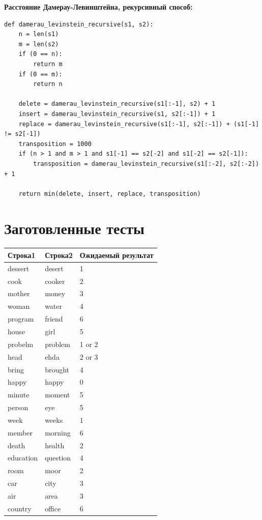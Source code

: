 \documentclass[a4paper,14pt]{report} %
\begin{document}
\textbf{Расстояние Дамерау-Левинштейна, рекурсивный способ: }
\begin{lstlisting}
def damerau_levinstein_recursive(s1, s2):
    n = len(s1)
    m = len(s2)
    if (0 == n):
        return m
    if (0 == m):
        return n

    delete = damerau_levinstein_recursive(s1[:-1], s2) + 1
    insert = damerau_levinstein_recursive(s1, s2[:-1]) + 1
    replace = damerau_levinstein_recursive(s1[:-1], s2[:-1]) + (s1[-1] != s2[-1])
    transposition = 1000
    if (n > 1 and m > 1 and s1[-1] == s2[-2] and s1[-2] == s2[-1]):
        transposition = damerau_levinstein_recursive(s1[:-2], s2[:-2]) + 1

    return min(delete, insert, replace, transposition)
\end{lstlisting}

\section{Заготовленные тесты}

\begin{tabular}{ | l | l | l |}
\hline
\textbf{Строка1} & \textbf{Строка2} & \textbf{Ожидаемый результат} \\ \hline
dessert & desert & 1 \\ \hline
cook & cooker & 2 \\ \hline
mother & money & 3 \\ \hline
woman & water & 4 \\ \hline
program & friend & 6 \\ \hline
house & girl & 5 \\ \hline
probelm & problem & 1 or 2 \\ \hline
head & ehda & 2 or 3 \\ \hline
bring & brought & 4 \\ \hline
happy & happy & 0\\  \hline
minute & moment & 5 \\ \hline
person & eye & 5 \\ \hline
week & weeks & 1 \\ \hline
member & morning & 6 \\ \hline
death & health & 2 \\ \hline
education & question & 4 \\ \hline
room & moor & 2 \\ \hline
car & city & 3 \\ \hline
air & area & 3 \\ \hline
country & office & 6 \\ \hline
\end{tabular}
\end{document}
